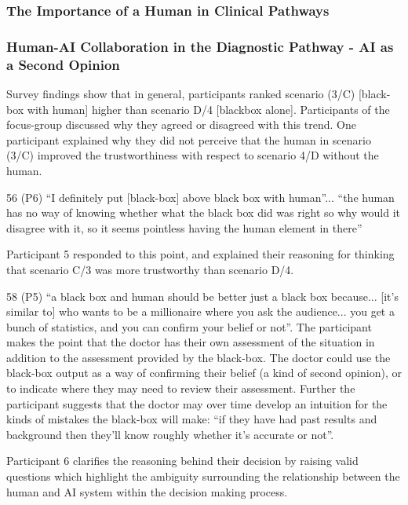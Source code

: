 \documentclass[manuscript,screen,review]{acmart}
\begin{document}
\subsubsection{The Importance of a Human in Clinical Pathways}




\subsubsection{}


\subsubsection{Human-AI Collaboration in the Diagnostic Pathway - AI as a Second Opinion}

Survey findings show that in general, participants ranked scenario (3/C) [black-box with human] higher than scenario D/4 [blackbox alone]. 
Participants of the focus-group discussed why they agreed or disagreed with this trend. One participant explained why they did not perceive that the human in scenario (3/C) improved the trustworthiness with respect to scenario 4/D without the human. 

56 (P6) “I definitely put [black-box] above black box with human”... 
“the human has no way of knowing whether what the black box did was right so why would it disagree with it, so it seems pointless having the human element in there”

Participant 5 responded to this point, and explained their reasoning for thinking that scenario C/3 was more trustworthy than scenario D/4. 

58 (P5) “a black box and human should be better just a black box because... [it's similar to] who wants to be a millionaire where you ask the audience... you get a bunch of statistics, and you can confirm your belief or not”. 
The participant makes the point that the doctor has their own assessment of the situation in addition to the assessment provided by the black-box.
The doctor could use the black-box output as a way of confirming their belief (a kind of second opinion), or to indicate where they may need to review their assessment. Further the participant suggests that the doctor may over time develop an intuition for the kinds of mistakes the black-box will make:
“if they have had past results and background then they’ll know roughly whether it’s accurate or not”.

Participant 6 clarifies the reasoning behind their decision by raising valid questions which highlight the ambiguity surrounding the relationship between the  human and AI system within the decision making process.
\end{document}
